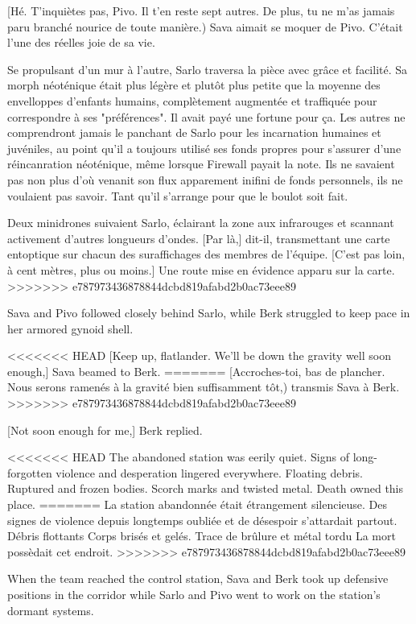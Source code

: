 [Hé. T'inquiètes pas, Pivo. Il t'en reste sept autres. De plus, tu ne m'as jamais paru branché nourice de toute manière.) Sava aimait se moquer de Pivo. C'était l'une des réelles joie de sa vie. 

Se propulsant d'un mur à l'autre, Sarlo traversa la pièce avec grâce et facilité. Sa morph néoténique était plus légère et plutôt plus petite que la moyenne des envelloppes d'enfants humains, complètement augmentée et traffiquée pour correspondre à ses "préférences". Il avait payé une fortune pour ça. Les autres ne comprendront jamais le panchant de Sarlo pour les incarnation humaines et juvéniles, au point qu'il a toujours utilisé ses fonds propres pour s'assurer d'une réincanration néoténique, même lorsque Firewall payait la note. Ils ne savaient pas non plus d'où venanit son flux apparement inifini de fonds personnels, ils ne voulaient pas savoir. Tant qu'il s'arrange pour que le boulot soit fait. 

Deux minidrones suivaient Sarlo, éclairant la zone aux infrarouges et scannant activement d'autres longueurs d'ondes. [Par là,] dit-il, transmettant une carte entoptique sur chacun des suraffichages des membres de l'équipe. [C'est pas loin, à cent mètres, plus ou moins.] Une route mise en évidence apparu sur la carte. 
>>>>>>> e787973436878844dcbd819afabd2b0ac73eee89

Sava and Pivo followed closely behind Sarlo, while Berk struggled to keep pace in her armored gynoid shell. 

<<<<<<< HEAD
[Keep up, flatlander. We'll be down the gravity well soon enough,] Sava beamed to Berk. 
=======
[Accroches-toi, bas de plancher. Nous serons ramenés à la gravité bien suffisamment tôt,) transmis Sava à Berk. 
>>>>>>> e787973436878844dcbd819afabd2b0ac73eee89

[Not soon enough for me,] Berk replied. 

<<<<<<< HEAD
The abandoned station was eerily quiet. Signs of long-forgotten violence and desperation lingered everywhere. Floating debris. Ruptured and frozen bodies. Scorch marks and twisted metal. Death owned this place. 
=======
La station abandonnée était étrangement silencieuse. Des signes de violence depuis longtemps oubliée et de désespoir s'attardait partout. Débris flottants Corps brisés et gelés. Trace de brûlure et métal tordu La mort possèdait cet endroit. 
>>>>>>> e787973436878844dcbd819afabd2b0ac73eee89

When the team reached the control station, Sava and Berk took up defensive positions in the corridor while Sarlo and Pivo went to work on the station's dormant systems. 

